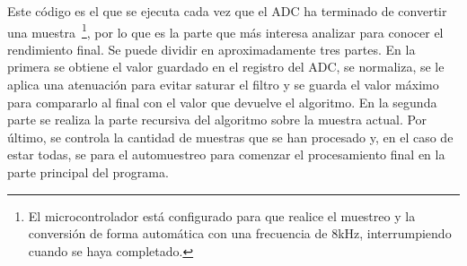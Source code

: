 Este código es el que se ejecuta cada vez que el ADC ha terminado de convertir una muestra~\footnote{El microcontrolador está configurado para que realice el muestreo y la conversión de forma automática con una frecuencia de 8kHz, interrumpiendo cuando se haya completado.}, por lo que es la parte que más interesa analizar para conocer el rendimiento final. Se puede dividir en aproximadamente tres partes. En la primera se obtiene el valor guardado en el registro del ADC, se normaliza, se le aplica una atenuación para evitar saturar el filtro y se guarda el valor máximo para compararlo al final con el valor que devuelve el algoritmo. En la segunda parte se realiza la parte recursiva del algoritmo sobre la muestra actual. Por último, se controla la cantidad de muestras que se han procesado y, en el caso de estar todas, se para el automuestreo para comenzar el procesamiento final en la parte principal del programa.

